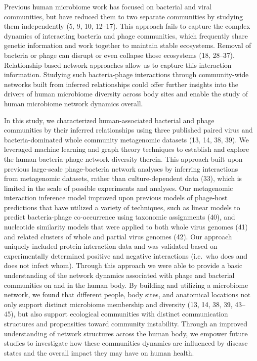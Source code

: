 \documentclass[12pt,]{article}
\begin{document}
Previous human microbiome work has focused on bacterial and viral
communities, but have reduced them to two separate communities by
studying them independently (5, 9, 10, 12--17). This approach fails to
capture the complex dynamics of interacting bacteria and phage
communities, which frequently share genetic information and work
together to maintain stable ecosystems. Removal of bacteria or phage can
disrupt or even collapse those ecosystems (18, 28--37).
Relationship-based network approaches allow us to capture this
interaction information. Studying such bacteria-phage interactions
through community-wide networks built from inferred relationships could
offer further insights into the drivers of human microbiome diversity
across body sites and enable the study of human microbiome network
dynamics overall.

In this study, we characterized human-associated bacterial and phage
communities by their inferred relationships using three published paired
virus and bacteria-dominated whole community metagenomic datasets (13,
14, 38, 39). We leveraged machine learning and graph theory techniques
to establish and explore the human bacteria-phage network diversity
therein. This approach built upon previous large-scale phage-bacteria
network analyses by inferring interactions from metagenomic datasets,
rather than culture-dependent data (33), which is limited in the scale
of possible experiments and analyses. Our metagenomic interaction
inference model improved upon previous models of phage-host predictions
that have utilized a variety of techniques, such as linear models to
predict bacteria-phage co-occurrence using taxonomic assignments (40),
and nucleotide similarity models that were applied to both whole virus
genomes (41) and related clusters of whole and partial virus genomes
(42). Our approach uniquely included protein interaction data and was
validated based on experimentally determined positive and negative
interactions (i.e.~who does and does not infect whom). Through this
approach we were able to provide a basic understanding of the network
dynamics associated with phage and bacterial communities on and in the
human body. By building and utilizing a microbiome network, we found
that different people, body sites, and anatomical locations not only
support distinct microbiome membership and diversity (13, 14, 38, 39,
43--45), but also support ecological communities with distinct
communication structures and propensities toward community instability.
Through an improved understanding of network structures across the human
body, we empower future studies to investigate how these communities
dynamics are influenced by disease states and the overall impact they
may have on human health.
\end{document}
